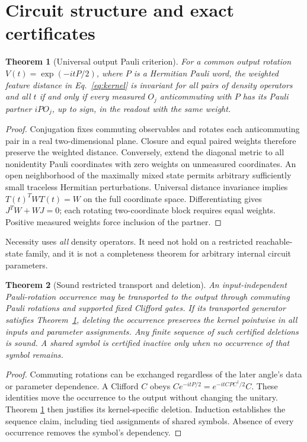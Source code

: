 \documentclass[a4paper,twocolumn,11pt,unpublished]{quantumarticle}
\newtheorem{theorem}{Theorem}
\begin{document}
\section{Circuit structure and exact certificates}
\label{sec:structure}
\begin{theorem}[Universal output Pauli criterion]
\label{thm:output}
For a common output rotation $V(t)=\exp(-itP/2)$, where $P$ is a
Hermitian Pauli word, the weighted feature distance in
Eq.~\eqref{eq:kernel} is invariant for all pairs of density operators
and all $t$ if and only if every measured $O_j$ anticommuting with $P$
has its Pauli partner $iPO_j$, up to sign, in the readout with the
same weight.
\end{theorem}
\begin{proof}
Conjugation fixes commuting observables and rotates each anticommuting
pair in a real two-dimensional plane. Closure and equal paired weights
therefore preserve the weighted distance. Conversely, extend the
diagonal metric to all nonidentity Pauli coordinates with zero weights
on unmeasured coordinates. An open neighborhood of the maximally mixed
state permits arbitrary sufficiently small traceless Hermitian
perturbations. Universal distance invariance implies $T(t)^TWT(t)=W$
on the full coordinate space. Differentiating gives $J^TW+WJ=0$;
each rotating two-coordinate block requires equal weights. Positive
measured weights force inclusion of the partner.
\end{proof}
Necessity uses \emph{all} density operators. It need not hold on a
restricted reachable-state family, and it is not a completeness theorem
for arbitrary internal circuit parameters.



\begin{theorem}[Sound restricted transport and deletion]
\label{thm:transport}
An input-independent Pauli-rotation occurrence may be transported to
the output through commuting Pauli rotations and supported fixed
Clifford gates. If its transported generator satisfies
Theorem~\ref{thm:output}, deleting the occurrence preserves the kernel
pointwise in all inputs and parameter assignments. Any finite sequence
of such certified deletions is sound. A shared symbol is certified
inactive only when no occurrence of that symbol remains.
\end{theorem}
\begin{proof}
Commuting rotations can be exchanged regardless of the later angle's
data or parameter dependence. A Clifford $C$ obeys
$C e^{-itP/2}=e^{-itCPC^\dagger/2}C$. These identities move the
occurrence to the output without changing the unitary. Theorem
\ref{thm:output} then justifies its kernel-specific deletion.
Induction establishes the sequence claim, including tied assignments
of shared symbols. Absence of every occurrence removes the symbol's
dependency.
\end{proof}
\end{document}
